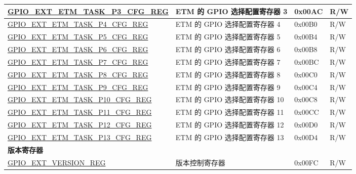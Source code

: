 \begin{longtable}{ | p{6.2cm} | p{7cm} | p{1.3cm} | p{1cm} | }
\hyperref[regdesc:GPIOSDETMTASKP3CFGREG]{GPIO\_EXT\_ETM\_TASK\_P3\_CFG\_REG} & ETM 的 GPIO 选择配置寄存器 3 & 0x00AC & R/W \\ \hline
\hyperref[regdesc:GPIOSDETMTASKP4CFGREG]{GPIO\_EXT\_ETM\_TASK\_P4\_CFG\_REG} & ETM 的 GPIO 选择配置寄存器 4 & 0x00B0 & R/W \\ \hline
\hyperref[regdesc:GPIOSDETMTASKP5CFGREG]{GPIO\_EXT\_ETM\_TASK\_P5\_CFG\_REG} & ETM 的 GPIO 选择配置寄存器 5 & 0x00B4 & R/W \\ \hline
\hyperref[regdesc:GPIOSDETMTASKP6CFGREG]{GPIO\_EXT\_ETM\_TASK\_P6\_CFG\_REG} & ETM 的 GPIO 选择配置寄存器 6 & 0x00B8 & R/W \\ \hline
\hyperref[regdesc:GPIOSDETMTASKP7CFGREG]{GPIO\_EXT\_ETM\_TASK\_P7\_CFG\_REG} & ETM 的 GPIO 选择配置寄存器 7 & 0x00BC & R/W \\ \hline
\hyperref[regdesc:GPIOSDETMTASKP8CFGREG]{GPIO\_EXT\_ETM\_TASK\_P8\_CFG\_REG} & ETM 的 GPIO 选择配置寄存器 8 & 0x00C0 & R/W \\ \hline
\hyperref[regdesc:GPIOSDETMTASKP9CFGREG]{GPIO\_EXT\_ETM\_TASK\_P9\_CFG\_REG} & ETM 的 GPIO 选择配置寄存器 9 & 0x00C4 & R/W \\ \hline
\hyperref[regdesc:GPIOSDETMTASKP10CFGREG]{GPIO\_EXT\_ETM\_TASK\_P10\_CFG\_REG} & ETM 的 GPIO 选择配置寄存器 10 & 0x00C8 & R/W \\ \hline
\hyperref[regdesc:GPIOSDETMTASKP11CFGREG]{GPIO\_EXT\_ETM\_TASK\_P11\_CFG\_REG} & ETM 的 GPIO 选择配置寄存器 11 & 0x00CC & R/W \\ \hline
\hyperref[regdesc:GPIOSDETMTASKP12CFGREG]{GPIO\_EXT\_ETM\_TASK\_P12\_CFG\_REG} & ETM 的 GPIO 选择配置寄存器 12 & 0x00D0 & R/W \\ \hline
\hyperref[regdesc:GPIOSDETMTASKP13CFGREG]{GPIO\_EXT\_ETM\_TASK\_P13\_CFG\_REG} & ETM 的 GPIO 选择配置寄存器 13 & 0x00D4 & R/W \\ \hline
\multicolumn{4}{|l|}{\textbf{版本寄存器}} \\ \hline
\hyperref[regdesc:GPIOSDVERSIONREG]{GPIO\_EXT\_VERSION\_REG} & 版本控制寄存器 & 0x00FC & R/W \\ \hline
\end{longtable}
